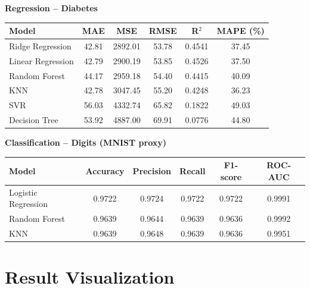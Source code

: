 \documentclass[12pt,a4paper]{article}
\newenvironment{fitwidth}
  {\begin{lrbox}{\fitbox}}
  {\end{lrbox}\ifdim\wd\fitbox>\linewidth\resizebox{\linewidth}{!}{\usebox{\fitbox}}\else\usebox{\fitbox}\fi}
\DeclareRobustCommand{\_}{\textunderscore\allowbreak}
\begin{document}
\vspace{0.3cm}
\begin{center}
\begin{minipage}{\linewidth}\centering
\textbf{Regression -- Diabetes}\par\smallskip
\begin{fitwidth}
\begin{tabular}{lccccc}
\toprule
Model & MAE & MSE & RMSE & R$^2$ & MAPE (\%)\\
\midrule
Ridge Regression & 42.81 & 2892.01 & 53.78 & 0.4541 & 37.45 \\
Linear Regression & 42.79 & 2900.19 & 53.85 & 0.4526 & 37.50 \\
Random Forest & 44.17 & 2959.18 & 54.40 & 0.4415 & 40.09 \\
KNN & 42.78 & 3047.45 & 55.20 & 0.4248 & 36.23 \\
SVR & 56.03 & 4332.74 & 65.82 & 0.1822 & 49.03 \\
Decision Tree & 53.92 & 4887.00 & 69.91 & 0.0776 & 44.80 \\
\bottomrule
\end{tabular}
\end{fitwidth}
\end{minipage}
\end{center}

\vspace{0.3cm}
\begin{center}
\begin{minipage}{\linewidth}\centering
\textbf{Classification -- Digits (MNIST proxy)}\par\smallskip
\begin{fitwidth}
\begin{tabular}{lccccc}
\toprule
Model & Accuracy & Precision & Recall & F1-score & ROC-AUC\\
\midrule
Logistic Regression & 0.9722 & 0.9724 & 0.9722 & 0.9722 & 0.9991 \\
Random Forest & 0.9639 & 0.9644 & 0.9639 & 0.9636 & 0.9992 \\
KNN & 0.9639 & 0.9648 & 0.9639 & 0.9636 & 0.9951 \\
\bottomrule
\end{tabular}
\end{fitwidth}
\end{minipage}
\end{center}

\section{Result Visualization}
\end{document}
